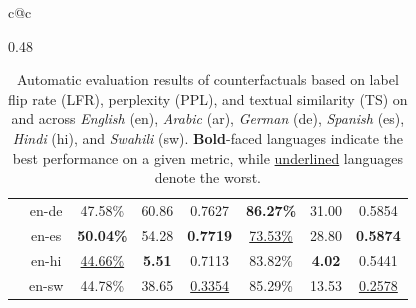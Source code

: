 \begin{table}[t!]
\begin{tabular}{c@{\hspace{1em}}c}
\begin{subtable}[c]{0.48\textwidth}
{\begin{tabular}{ccccc|ccc}
          & \cellcolor[HTML]{E0E6FF}\textsf{en}-\textsf{de} & \cellcolor[HTML]{E0E6FF}47.58\% & \cellcolor[HTML]{E0E6FF}60.86 & \cellcolor[HTML]{E0E6FF}0.7627 & \cellcolor[HTML]{E0E6FF}\textbf{86.27\%} & \cellcolor[HTML]{E0E6FF}31.00 & \cellcolor[HTML]{E0E6FF}0.5854\\
          & \cellcolor[HTML]{FFF1D5}\textsf{en}-\textsf{es} & \cellcolor[HTML]{FFF1D5}\textbf{50.04\%} & \cellcolor[HTML]{FFF1D5}54.28 & \cellcolor[HTML]{FFF1D5}\textbf{0.7719} & \cellcolor[HTML]{FFF1D5}\underline{73.53\%} & \cellcolor[HTML]{FFF1D5}28.80 & \cellcolor[HTML]{FFF1D5}\textbf{0.5874} \\
          & \cellcolor[HTML]{F2CFC2}\textsf{en}-\textsf{hi} & \cellcolor[HTML]{F2CFC2}\underline{44.66\%} & \cellcolor[HTML]{F2CFC2}\textbf{5.51} & \cellcolor[HTML]{F2CFC2}0.7113 & \cellcolor[HTML]{F2CFC2}83.82\% & \cellcolor[HTML]{F2CFC2}\textbf{4.02} & \cellcolor[HTML]{F2CFC2}0.5441\\
          & \cellcolor[HTML]{DDF6D2}\textsf{en}-\textsf{sw} & \cellcolor[HTML]{DDF6D2}44.78\% & \cellcolor[HTML]{DDF6D2}38.65 & \cellcolor[HTML]{DDF6D2}\underline{0.3354} & \cellcolor[HTML]{DDF6D2}85.29\% & \cellcolor[HTML]{DDF6D2}13.53 & \cellcolor[HTML]{DDF6D2}\underline{0.2578}\\


        \toprule[1.5pt]
        \end{tabular}
        }
        \caption{Translation-based counterfactuals $\tilde{x}_{\textsf{en}\text{-}\ell}$.}
        \label{subtab:translation}
  \end{subtable}

    \end{tabular}

    \vspace{0.5em}
    \caption{Automatic evaluation results of counterfactuals based on label flip rate (LFR), perplexity (PPL), and textual similarity (TS) on  and  across \textit{English} (\colorbox[HTML]{d8d8d8}{\textsf{en}}), \textit{Arabic} (\colorbox[HTML]{E5CCFF}{\textsf{ar}}), \textit{German} (\colorbox[HTML]{E0E6FF}{\textsf{de}}), \textit{Spanish} (\colorbox[HTML]{FFF1D5}{\textsf{es}}), \textit{Hindi} (\colorbox[HTML]{F2CFC2}{\textsf{hi}}), and \textit{Swahili} (\colorbox[HTML]{DDF6D2}{\textsf{sw}}). \textbf{Bold}-faced languages indicate the best performance on a given metric, while \underline{underlined} languages denote the worst.
    }
    \label{tab:automatic_evaluation}
\end{table}
